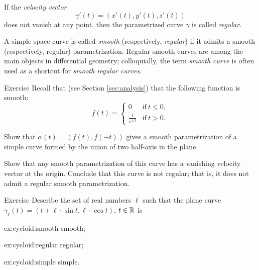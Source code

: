If the \emph{velocity vector} 
\[\gamma'(t)=(x'(t),y'(t),z'(t))\] 
does not vanish at any point, then the parametrized curve $\gamma$ is called \emph{regular}.

A simple space curve is called \emph{smooth} (respectively, \emph{regular}) if it admits a smooth (respectively, regular) parametrization.
Regular smooth curves are among the main objects in differential geometry;
colloquially, the term \emph{smooth curve} is often used as a shortcut for {}\emph{smooth regular curves}. 

\begin{thm}{Exercise}\label{ex:L-shape}
Recall that (see Section \ref{sec:analysis}) that the following function is smooth: 
\[f(t)=
\begin{cases}
0&\text{if}\ t\le 0,
\\
\frac{t}{e^{1\!/\!t}}&\text{if}\ t> 0.
\end{cases}
\]

Show that $\alpha(t)=(f(t),f(-t))$ gives a smooth parametrization of a simple curve formed by the union of two half-axis in the plane.

Show that any smooth parametrization of this curve has a vanishing velocity vector at the origin.
Conclude that this curve is not regular;
that is, it does not admit a regular smooth parametrization.
\end{thm}


\begin{thm}{Exercise}\label{ex:cycloid}
Describe the set of real numbers $\ell$
such that the plane curve $\gamma_\ell (t)= (t+\ell \cdot \sin t,\ell \cdot \cos t)$, $t\in\mathbb{R}$ is

\begin{minipage}{.30\textwidth}
\begin{subthm}{ex:cycloid:smooth}
smooth; 
\end{subthm}
\end{minipage}
\hfill
\begin{minipage}{.30\textwidth}
\begin{subthm}{ex:cycloid:regular}
regular;
\end{subthm}
\end{minipage}
\hfill
\begin{minipage}{.30\textwidth}
\begin{subthm}{ex:cycloid:simple}
simple.
\end{subthm}
\end{minipage}

\end{thm}

